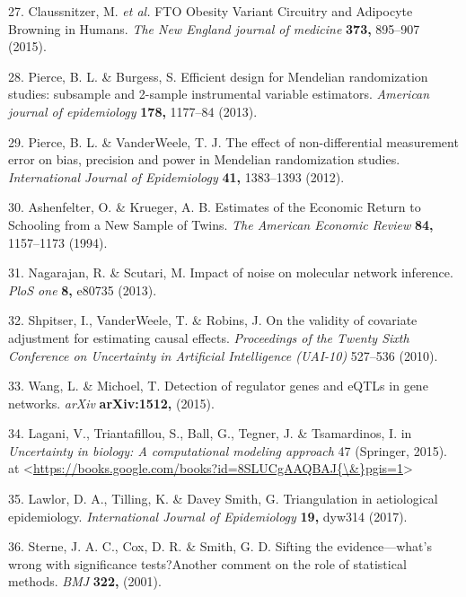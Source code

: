 \documentclass[]{article}
\begin{document}
\hypertarget{ref-Claussnitzer2015}{}
27. Claussnitzer, M. \emph{et al.} FTO Obesity Variant Circuitry and
Adipocyte Browning in Humans. \emph{The New England journal of medicine}
\textbf{373,} 895--907 (2015).

\hypertarget{ref-Pierce2013}{}
28. Pierce, B. L. \& Burgess, S. Efficient design for Mendelian
randomization studies: subsample and 2-sample instrumental variable
estimators. \emph{American journal of epidemiology} \textbf{178,}
1177--84 (2013).

\hypertarget{ref-Pierce2012}{}
29. Pierce, B. L. \& VanderWeele, T. J. The effect of non-differential
measurement error on bias, precision and power in Mendelian
randomization studies. \emph{International Journal of Epidemiology}
\textbf{41,} 1383--1393 (2012).

\hypertarget{ref-Ashenfelter1994}{}
30. Ashenfelter, O. \& Krueger, A. B. Estimates of the Economic Return
to Schooling from a New Sample of Twins. \emph{The American Economic
Review} \textbf{84,} 1157--1173 (1994).

\hypertarget{ref-Nagarajan2013}{}
31. Nagarajan, R. \& Scutari, M. Impact of noise on molecular network
inference. \emph{PloS one} \textbf{8,} e80735 (2013).

\hypertarget{ref-Shpitser2010}{}
32. Shpitser, I., VanderWeele, T. \& Robins, J. On the validity of
covariate adjustment for estimating causal effects. \emph{Proceedings of
the Twenty Sixth Conference on Uncertainty in Artificial Intelligence
(UAI-10)} 527--536 (2010).

\hypertarget{ref-Wang2015}{}
33. Wang, L. \& Michoel, T. Detection of regulator genes and eQTLs in
gene networks. \emph{arXiv} \textbf{arXiv:1512,} (2015).

\hypertarget{ref-Lagani2015}{}
34. Lagani, V., Triantafillou, S., Ball, G., Tegner, J. \& Tsamardinos,
I. in \emph{Uncertainty in biology: A computational modeling approach}
47 (Springer, 2015). at
\textless{}\href{https://books.google.com/books?id=8SLUCgAAQBAJ\%7B/\&\%7Dpgis=1}{https://books.google.com/books?id=8SLUCgAAQBAJ\{\textbackslash{}\&\}pgis=1}\textgreater{}

\hypertarget{ref-Lawlor2017}{}
35. Lawlor, D. A., Tilling, K. \& Davey Smith, G. Triangulation in
aetiological epidemiology. \emph{International Journal of Epidemiology}
\textbf{19,} dyw314 (2017).

\hypertarget{ref-Sterne2001}{}
36. Sterne, J. A. C., Cox, D. R. \& Smith, G. D. Sifting the
evidence---what's wrong with significance tests?Another comment on the
role of statistical methods. \emph{BMJ} \textbf{322,} (2001).
\end{document}
